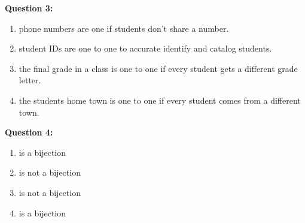 \documentclass[11pt]{article}
\begin{document}
\begin{enumerate}
\textbf{Question 3:}

\begin{enumerate}[label=(\alph*)]
\item
phone numbers are one if students don't share a number.

\item
student IDs are one to one to accurate identify and catalog students.

\item 
the final grade in a class is one to one if every student gets a different grade letter.

\item 
the students home town is one to one if every student comes from a different town. 

\end{enumerate}

\textbf{Question 4:}

\begin{enumerate}[label=(\alph*)]
\item
is a bijection

\item
is not a bijection 

\item 
is not a bijection 

\item 
is a bijection 

\end{enumerate}

\end{enumerate}
\end{document}
